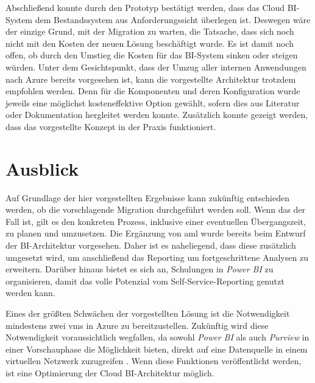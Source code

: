 Abschließend konnte durch den Prototyp bestätigt werden, dass das Cloud BI-System dem Bestandssystem aus Anforderungssicht überlegen ist. Deswegen wäre der einzige Grund, mit der Migration zu warten, die Tatsache, dass sich noch nicht mit den Kosten der neuen Lösung beschäftigt wurde. Es ist damit noch offen, ob durch den Umstieg die Kosten für das BI-System sinken oder steigen würden. Unter dem Gesichtspunkt, dass der Umzug aller internen Anwendungen nach Azure bereits vorgesehen ist, kann die vorgestellte Architektur trotzdem empfohlen werden. Denn für die Komponenten und deren Konfiguration wurde jeweils eine möglichst kosteneffektive Option gewählt, sofern dies aus Literatur oder Dokumentation hergleitet werden konnte. Zusätzlich konnte gezeigt werden, dass das vorgestellte Konzept in der Praxis funktioniert. 

\section{Ausblick}
Auf Grundlage der hier vorgestellten Ergebnisse kann zukünftig entschieden werden, ob die vorschlagende Migration durchgeführt werden soll. Wenn das der Fall ist, gilt es den konkreten Prozess, inklusive einer eventuellen Übergangszeit, zu planen und umzusetzen. Die Ergänzung von \ac{aml} wurde bereits beim Entwurf der BI-Architektur vorgesehen. Daher ist es naheliegend, dass diese zusätzlich umgesetzt wird, um anschließend das Reporting um fortgeschrittene Analysen zu erweitern. Darüber hinaus bietet es sich an, Schulungen in \textit{Power BI} zu organisieren, damit das volle Potenzial vom Self-Service-Reporting genutzt werden kann.

Eines der größten Schwächen der vorgestellten Lösung ist die Notwendigkeit mindestens zwei \acp{vm} in Azure zu bereitzustellen. Zukünftig wird diese Notwendigkeit voraussichtlich wegfallen, da sowohl \textit{Power BI} als auch \textit{Purview} in einer Vorschauphase die Möglichkeit bieten, direkt auf eine Datenquelle in einem virtuellen Netzwerk zuzugreifen \cite{msdoc_22_purview_manPE, msdoc_22_pbi_vnetGateway}. Wenn diese Funktionen veröffentlicht werden, ist eine Optimierung der Cloud BI-Architektur möglich.